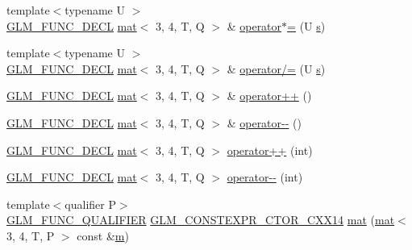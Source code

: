 \begin{DoxyCompactItemize}
\item 
{\footnotesize template$<$typename U $>$ }\\\mbox{\hyperlink{setup_8hpp_ab2d052de21a70539923e9bcbf6e83a51}{G\+L\+M\+\_\+\+F\+U\+N\+C\+\_\+\+D\+E\+CL}} \mbox{\hyperlink{structglm_1_1mat}{mat}}$<$ 3, 4, T, Q $>$ \& \mbox{\hyperlink{structglm_1_1mat_3_013_00_014_00_01_t_00_01_q_01_4_a7e71aded236353963c211f3c5401201f}{operator$\ast$=}} (U \mbox{\hyperlink{_s_d_l__opengl_8h_a4af680a6c683f88ed67b76f207f2e6e4}{s}})
\item 
{\footnotesize template$<$typename U $>$ }\\\mbox{\hyperlink{setup_8hpp_ab2d052de21a70539923e9bcbf6e83a51}{G\+L\+M\+\_\+\+F\+U\+N\+C\+\_\+\+D\+E\+CL}} \mbox{\hyperlink{structglm_1_1mat}{mat}}$<$ 3, 4, T, Q $>$ \& \mbox{\hyperlink{structglm_1_1mat_3_013_00_014_00_01_t_00_01_q_01_4_ad030328f7205db4ada21b930d484bdea}{operator/=}} (U \mbox{\hyperlink{_s_d_l__opengl_8h_a4af680a6c683f88ed67b76f207f2e6e4}{s}})
\item 
\mbox{\hyperlink{setup_8hpp_ab2d052de21a70539923e9bcbf6e83a51}{G\+L\+M\+\_\+\+F\+U\+N\+C\+\_\+\+D\+E\+CL}} \mbox{\hyperlink{structglm_1_1mat}{mat}}$<$ 3, 4, T, Q $>$ \& \mbox{\hyperlink{structglm_1_1mat_3_013_00_014_00_01_t_00_01_q_01_4_a03979bbfa60bbc49190ce6fd347ca6ee}{operator++}} ()
\item 
\mbox{\hyperlink{setup_8hpp_ab2d052de21a70539923e9bcbf6e83a51}{G\+L\+M\+\_\+\+F\+U\+N\+C\+\_\+\+D\+E\+CL}} \mbox{\hyperlink{structglm_1_1mat}{mat}}$<$ 3, 4, T, Q $>$ \& \mbox{\hyperlink{structglm_1_1mat_3_013_00_014_00_01_t_00_01_q_01_4_a127c5f4434bbd959b577ae5dfd808c10}{operator-\/-\/}} ()
\item 
\mbox{\hyperlink{setup_8hpp_ab2d052de21a70539923e9bcbf6e83a51}{G\+L\+M\+\_\+\+F\+U\+N\+C\+\_\+\+D\+E\+CL}} \mbox{\hyperlink{structglm_1_1mat}{mat}}$<$ 3, 4, T, Q $>$ \mbox{\hyperlink{structglm_1_1mat_3_013_00_014_00_01_t_00_01_q_01_4_ad8fc281f2fb4cd5fd107f4c4a1a04be8}{operator++}} (int)
\item 
\mbox{\hyperlink{setup_8hpp_ab2d052de21a70539923e9bcbf6e83a51}{G\+L\+M\+\_\+\+F\+U\+N\+C\+\_\+\+D\+E\+CL}} \mbox{\hyperlink{structglm_1_1mat}{mat}}$<$ 3, 4, T, Q $>$ \mbox{\hyperlink{structglm_1_1mat_3_013_00_014_00_01_t_00_01_q_01_4_a61b4e82bca6ca608b52da28a1ea5333a}{operator-\/-\/}} (int)
\item 
{\footnotesize template$<$qualifier P$>$ }\\\mbox{\hyperlink{setup_8hpp_a33fdea6f91c5f834105f7415e2a64407}{G\+L\+M\+\_\+\+F\+U\+N\+C\+\_\+\+Q\+U\+A\+L\+I\+F\+I\+ER}} \mbox{\hyperlink{setup_8hpp_a0900f9145e68bf6061b6f5e7be3fa751}{G\+L\+M\+\_\+\+C\+O\+N\+S\+T\+E\+X\+P\+R\+\_\+\+C\+T\+O\+R\+\_\+\+C\+X\+X14}} \mbox{\hyperlink{structglm_1_1mat_3_013_00_014_00_01_t_00_01_q_01_4_aa9f1719851a776d4147f74a7883cb577}{mat}} (\mbox{\hyperlink{structglm_1_1mat}{mat}}$<$ 3, 4, T, P $>$ const \&\mbox{\hyperlink{_s_d_l__opengl__glext_8h_af593500c283bf1a787a6f947f503a5c2}{m}})

\end{DoxyCompactItemize}
